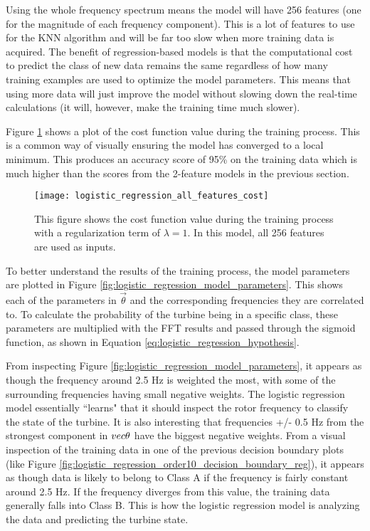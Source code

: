Using the whole frequency spectrum means the model will have 256 features (one for the magnitude of each frequency component).  This is a lot of features to use for the KNN algorithm and will be far too slow when more training data is acquired.  The benefit of regression-based models is that the computational cost to predict the class of new data remains the same regardless of how many training examples are used to optimize the model parameters.  This means that using more data will just improve the model without slowing down the real-time calculations (it will, however, make the training time much slower).

Figure \ref{fig:logistic_regression_all_features_cost} shows a plot of the cost function value during the training process.  This is a common way of visually ensuring the model has converged to a local minimum. This produces an accuracy score of 95\% on the training data which is much higher than the scores from the 2-feature models in the previous section.

\begin{figure}
	\centering
	\texttt{[image: logistic\_regression\_all\_features\_cost]}
	\decoRule
	\caption{This figure shows the cost function value during the training process with a regularization term of $\lambda=1$.  In this model, all 256 features are used as inputs.}
	\label{fig:logistic_regression_all_features_cost}
\end{figure}

To better understand the results of the training process, the model parameters are plotted in Figure \ref{fig:logistic_regression_model_parameters}.  This shows each of the parameters in $\vec{\theta}$ and the corresponding frequencies they are correlated to.  To calculate the probability of the turbine being in a specific class, these parameters are multiplied with the FFT results and passed through the sigmoid function, as shown in Equation \ref{eq:logistic_regression_hypothesis}.

From inspecting Figure \ref{fig:logistic_regression_model_parameters}, it appears as though the frequency around 2.5 Hz is weighted the most, with some of the surrounding frequencies having small negative weights.  The logistic regression model essentially ``learns" that it should inspect the rotor frequency to classify the state of the turbine.    It is also interesting that frequencies +/- 0.5 Hz from the strongest component in $\\vec{\theta}$ have the biggest negative weights.  From a visual inspection of the training data in one of the previous decision boundary plots (like Figure \ref{fig:logistic_regression_order10_decision_boundary_reg}), it appears as though data is likely to belong to Class A if the frequency is fairly constant around 2.5 Hz.  If the frequency diverges from this value, the training data generally falls into Class B.  This is how the logistic regression model is analyzing the data and predicting the turbine state.

